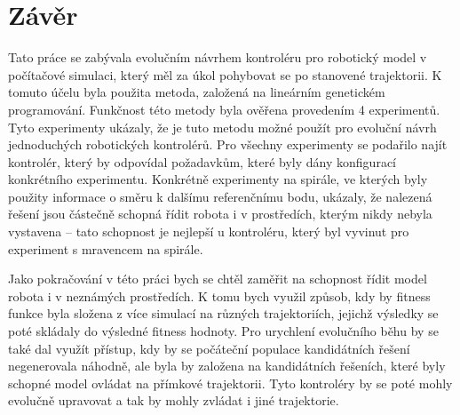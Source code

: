\chapter{Závěr}
\label{chap:zaver}
Tato práce se zabývala evolučním návrhem kontroléru pro robotický model v počítačové simulaci, který měl za úkol pohybovat se po stanovené trajektorii.
K tomuto účelu byla použita metoda, založená na lineárním genetickém programování.
Funkčnost této metody byla ověřena provedením 4 experimentů.
Tyto experimenty ukázaly, že je tuto metodu možné použít pro evoluční návrh jednoduchých robotických kontrolérů.
Pro všechny experimenty se podařilo najít kontrolér, který by odpovídal požadavkům, které byly dány konfigurací konkrétního experimentu.
Konkrétně experimenty na spirále, ve kterých byly použity informace o směru k dalšímu referenčnímu bodu, ukázaly, že nalezená řešení jsou částečně schopná řídit robota i v prostředích, kterým nikdy nebyla vystavena -- tato schopnost je nejlepší u kontroléru, který byl vyvinut pro experiment s mravencem na spirále.

Jako pokračování v této práci bych se chtěl zaměřit na schopnost řídit model robota i v neznámých prostředích.
K tomu bych využil způsob, kdy by fitness funkce byla složena z více simulací na různých trajektoriích, jejichž výsledky se poté skládaly do výsledné fitness hodnoty.
Pro urychlení evolučního běhu by se také dal využít přístup, kdy by se počáteční populace kandidátních řešení negenerovala náhodně, ale byla by založena na kandidátních řešeních, které byly schopné model ovládat na přímkové trajektorii.
Tyto kontroléry by se poté mohly evolučně upravovat a tak by mohly zvládat i jiné trajektorie.

